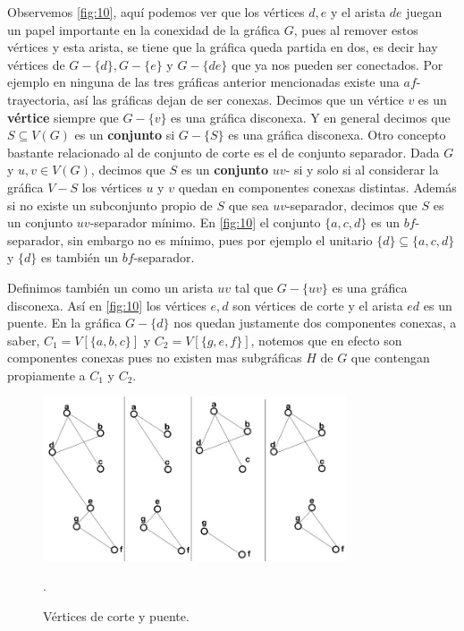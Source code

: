 Observemos \cref{fig:10}, aquí podemos ver que los vértices $d,e$ y el arista $de$ juegan un papel importante en la conexidad de la gráfica $G$, pues al remover estos vértices y esta arista, se tiene que la gráfica queda partida en dos, es decir hay vértices de $G-\{d\}, G-\{e\}$ y $G-\{ de\}$ que ya nos pueden ser conectados. Por ejemplo en ninguna de las tres gráficas anterior mencionadas existe una $af$-trayectoria, así las gráficas dejan de ser conexas.
Decimos que un vértice $v$ es un \textbf{vértice}  siempre que $G-\{v\}$ es una gráfica disconexa. Y en general decimos que $S\subseteq V(G)$ es un \textbf{conjunto} si $G-\{S\}$ es una gráfica disconexa.
Otro concepto bastante relacionado al de conjunto de corte es el de conjunto separador. Dada $G$ y $u,v\in V(G)$, decimos que $S$ es un  \textbf{conjunto} $uv$- si y solo si al considerar la gráfica $V-S$ los vértices $u$ y $v$ quedan en componentes conexas distintas. Además si no existe un subconjunto propio de $S$ que sea $uv$-separador, decimos que $S$ es un conjunto $uv$-separador mínimo. En \cref{fig:10} el conjunto $\{a,c,d\}$ es un $bf$-separador, sin embargo no es mínimo, pues por ejemplo el unitario $\{d \} \subseteq \{a,c,d\}$ y $\{d \}$ es también un $bf$-separador. 

Definimos también un  como un arista $uv$ tal que $G-\{uv\}$ es una gráfica disconexa.
Así en \cref{fig:10} los vértices $e,d$ son vértices de corte y el arista $ed$ es un puente. En la gráfica $G-\{ d\}$ nos quedan justamente dos componentes conexas, a saber, $C_1=V[\{a,b,c \}]$ y $C_2=V[\{g,e,f\}]$, notemos que en efecto son componentes conexas pues no existen mas subgráficas $H$ de $G$ que contengan propiamente a $C_1$ y $C_2$. 

\begin{figure}[H]
  \centering
  \includegraphics[width=0.8\textwidth]{recursos/capturas/14.jpg}
  \caption{Vértices de corte y puente.}.
  \label{fig:09}
\end{figure}


